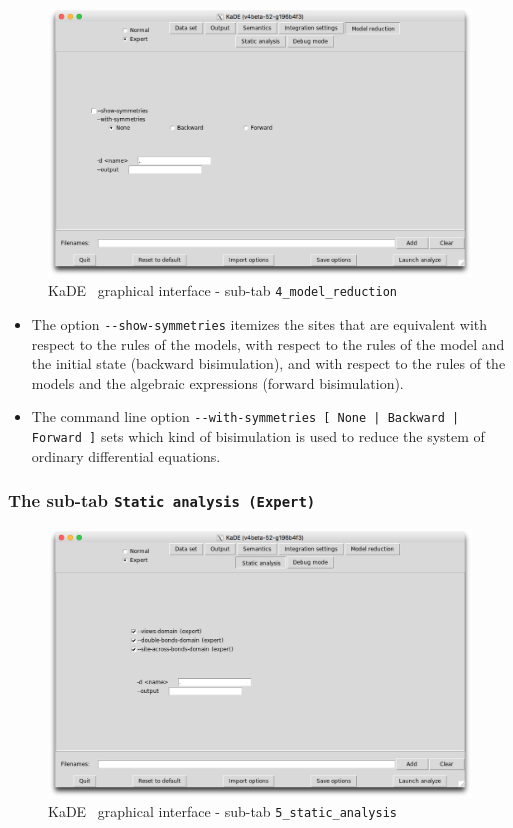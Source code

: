 \documentclass[11pt]{book}
\def\KaDE{\textsf{KaDE}}
\begin{document}
\begin{figure}[htbp]
\centering
\includegraphics[width=12cm,bb=0 0 1904 1208]{img/kade_4.png}
\caption{\KaDE~ graphical interface - sub-tab \texttt{4\_model\_reduction}}
\label{fig:kade:4}
\end{figure}


\begin{itemize}
  \item The option \texttt{-{}-show-symmetries} itemizes the sites that are equivalent with respect to the rules of the models, with respect to the rules of the model and the initial state (backward bisimulation), and with respect to the rules of the models and the algebraic expressions (forward bisimulation).
  \item The command line option \texttt{-{}-with-symmetries [ None | Backward | Forward ]} sets which kind of bisimulation is used to reduce the system of ordinary differential equations.
\end{itemize}

\subsubsection{The sub-tab \texttt{Static analysis (Expert)}}

\begin{figure}[htbp]
\centering
\includegraphics[width=12cm,bb=0 0 1904 1208]{img/kade_5.png}
\caption{\KaDE~ graphical interface - sub-tab \texttt{5\_static\_analysis}}
\label{fig:kade:5}
\end{figure}
\end{document}
